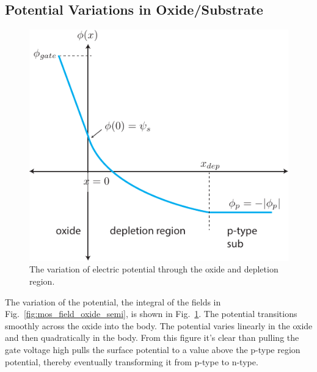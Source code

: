 \subsection{Potential Variations in Oxide/Substrate}
\begin{figure}[tbh]
\centering
\includegraphics[width=.5\columnwidth]{MOS_potential}
\caption{The variation of electric potential through the oxide and depletion region. } \label{fig:MOS_potential}
\end{figure}
The variation of the potential, the integral of the fields in Fig.~\ref{fig:mos_field_oxide_semi}, is shown in Fig.~\ref{fig:MOS_potential}.  The potential transitions smoothly across the oxide into the body.  The potential varies linearly in the oxide and then quadratically in the body.  From this figure it's clear than pulling the gate voltage high pulls the surface potential to a value above the p-type region potential, thereby eventually transforming it from p-type to n-type. 

